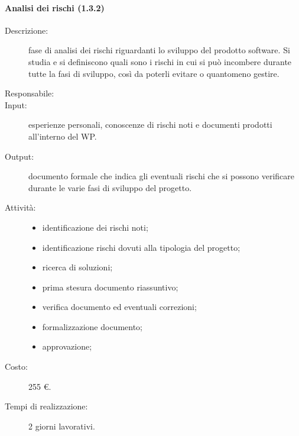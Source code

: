 \paragraph{Analisi dei rischi (1.3.2)}
\begin{description}
\item[Descrizione:] fase di analisi dei rischi riguardanti lo sviluppo del prodotto software. Si studia e si definiscono quali sono i rischi in cui si pu\`{o} incombere durante tutte la fasi di sviluppo, cos\`{i} da poterli evitare o quantomeno gestire.
\item[Responsabile:] 
\item[Input:] esperienze personali, conoscenze di rischi noti e documenti prodotti all'interno del WP.
\item[Output:] documento formale che indica gli eventuali rischi che si possono verificare durante le varie fasi di sviluppo del progetto.
\item[Attivit\`{a}:] 
\begin{center}
\begin{itemize}
\item identificazione dei rischi noti;
\item identificazione rischi dovuti alla tipologia del progetto;
\item ricerca di soluzioni;
\item prima stesura documento riassuntivo;
\item verifica documento ed eventuali correzioni;
\item formalizzazione documento;
\item approvazione;
\end{itemize}
\end{center}
\item[Costo:] 255 \euro{}.
\item[Tempi di realizzazione:] 2 giorni lavorativi.
\end{description}

